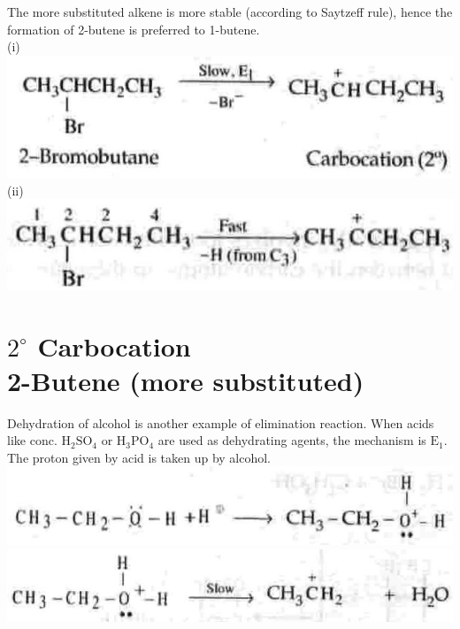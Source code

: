 \documentclass[10pt]{article}
\begin{document}
The more substituted alkene is more stable (according to Saytzeff rule), hence the formation of 2-butene is preferred to 1-butene.\\
(i)\\
\includegraphics[max width=\textwidth, center]{2025_01_28_8470952b98110cec3aabg-100}\\
(ii)\\
\includegraphics[max width=\textwidth, center]{2025_01_28_8470952b98110cec3aabg-100(3)}

\section*{$2^{\circ}$ Carbocation \\
 2-Butene (more substituted)}
Dehydration of alcohol is another example of elimination reaction. When acids like conc. $\mathrm{H}_{2} \mathrm{SO}_{4}$ or $\mathrm{H}_{3} \mathrm{PO}_{4}$ are used as dehydrating agents, the mechanism is $\mathrm{E}_{1}$. The proton given by acid is taken up by alcohol.\\
\includegraphics[max width=\textwidth, center]{2025_01_28_8470952b98110cec3aabg-100(1)}\\
\includegraphics[max width=\textwidth, center]{2025_01_28_8470952b98110cec3aabg-100(2)}
\end{document}
